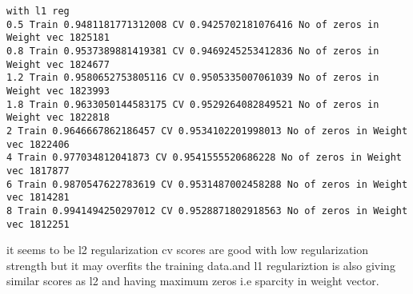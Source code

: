 \documentclass[11pt]{article}
\begin{document}
    \begin{Verbatim}[commandchars=\\\{\}]
with l1 reg
0.5 Train 0.9481181771312008 CV 0.9425702181076416 No of zeros in Weight vec 1825181
0.8 Train 0.9537389881419381 CV 0.9469245253412836 No of zeros in Weight vec 1824677
1.2 Train 0.9580652753805116 CV 0.9505335007061039 No of zeros in Weight vec 1823993
1.8 Train 0.9633050144583175 CV 0.9529264082849521 No of zeros in Weight vec 1822818
2 Train 0.9646667862186457 CV 0.9534102201998013 No of zeros in Weight vec 1822406
4 Train 0.977034812041873 CV 0.9541555520686228 No of zeros in Weight vec 1817877
6 Train 0.9870547622783619 CV 0.9531487002458288 No of zeros in Weight vec 1814281
8 Train 0.9941494250297012 CV 0.9528871802918563 No of zeros in Weight vec 1812251

    \end{Verbatim}

    it seems to be l2 regularization cv scores are good with low
regularization strength but it may overfits the training data.and l1
regulariztion is also giving similar scores as l2 and having maximum
zeros i.e sparcity in weight vector.
\end{document}
